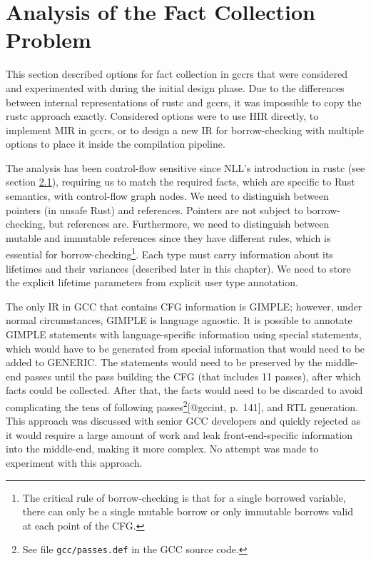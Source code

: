 \documentclass[
  11pt,
]{report}
\begin{document}
\section{Analysis of the Fact Collection
Problem}\label{analysis-of-the-fact-collection-problem}

This section described options for fact collection in gccrs that were
considered and experimented with during the initial design phase. Due to
the differences between internal representations of rustc and gccrs, it
was impossible to copy the rustc approach exactly. Considered options
were to use HIR directly, to implement MIR in gccrs, or to design a new
IR for borrow-checking with multiple options to place it inside the
compilation pipeline.

The analysis has been control-flow sensitive since NLL's introduction in
rustc (see section
\hyperref[the-evolution-of-borrow-checking-in-rustc]{2.1}), requiring us
to match the required facts, which are specific to Rust semantics, with
control-flow graph nodes. We need to distinguish between pointers (in
unsafe Rust) and references. Pointers are not subject to
borrow-checking, but references are. Furthermore, we need to distinguish
between mutable and immutable references since they have different
rules, which is essential for borrow-checking\footnote{The critical rule
  of borrow-checking is that for a single borrowed variable, there can
  only be a single mutable borrow or only immutable borrows valid at
  each point of the CFG.}. Each type must carry information about its
lifetimes and their variances (described later in this chapter). We need
to store the explicit lifetime parameters from explicit user type
annotation.

The only IR in GCC that contains CFG information is GIMPLE; however,
under normal circumstances, GIMPLE is language agnostic. It is possible
to annotate GIMPLE statements with language-specific information using
special statements, which would have to be generated from special
information that would need to be added to GENERIC. The statements would
need to be preserved by the middle-end passes until the pass building
the CFG (that includes 11 passes), after which facts could be collected.
After that, the facts would need to be discarded to avoid complicating
the tens of following passes\footnote{See file \texttt{gcc/passes.def}
  in the GCC source code.}{[}@gccint, p.~141{]}, and RTL generation.
This approach was discussed with senior GCC developers and quickly
rejected as it would require a large amount of work and leak
front-end-specific information into the middle-end, making it more
complex. No attempt was made to experiment with this approach.
\end{document}
